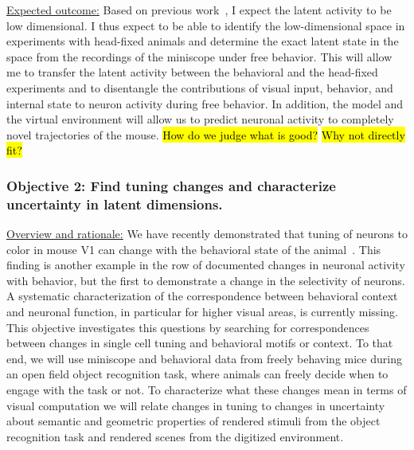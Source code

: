 \documentclass[COG,11pt]{ercgrant}
\begin{document}
\underline{Expected outcome:} 
Based on previous work~\parencite{Musall2019-kd, Stringer2019-lt}, I expect the latent activity to be low dimensional. 
I thus expect to be able to identify the low-dimensional space in experiments with head-fixed animals and determine the exact latent state in the space from the recordings of the miniscope under free behavior. 
This will allow me to transfer the latent activity between the behavioral and the head-fixed experiments and to disentangle the contributions of visual input, behavior, and internal state to neuron activity during free behavior. 
In addition, the model and the virtual environment will allow us to predict 
neuronal activity to completely novel trajectories of the mouse.
\hl{How do we judge what is good?} \hl{Why not directly fit?}


\subsubsection{Objective 2: Find tuning changes and characterize uncertainty in latent dimensions.\hfill{}}
\underline{Overview and rationale:} 
We have recently demonstrated that tuning of neurons to color in mouse V1 can change with the behavioral state of the animal~\parencite{Franke2022-do}.
This finding is another example in the row of documented changes in neuronal activity with behavior, but the first to demonstrate a change in the selectivity of neurons. 
A systematic characterization of the correspondence between behavioral context and neuronal function, in particular for higher visual areas, is currently missing. 
This objective investigates this questions by searching for correspondences between changes in single cell tuning and behavioral motifs or context.
To that end, we will use miniscope and behavioral data from freely behaving mice during an open field object recognition task, where animals can freely decide when to engage with the task or not.
To characterize what these changes mean in terms of visual computation we will relate changes in tuning to changes in uncertainty about semantic and geometric properties of rendered stimuli from the object recognition task and rendered scenes from the digitized environment.
\end{document}
